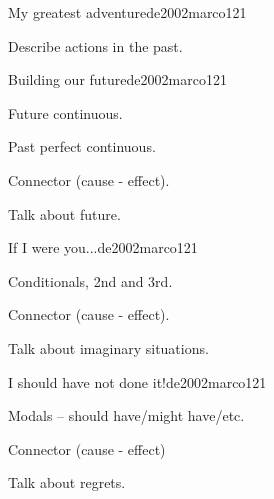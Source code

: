 \begin{syllabus}
\begin{unit}{My greatest adventure}{}{de2002marco}{12}{1}
   \begin{learningoutcomes}
      \item Describe actions in the past.
   \end{learningoutcomes}
\end{unit}

\begin{unit}{Building our future}{}{de2002marco}{12}{1}
   \begin{topics}
      \item Future continuous.
      \item Past perfect continuous.
      \item Connector (cause - effect).
   \end{topics}

   \begin{learningoutcomes}
      \item Talk about future.
   \end{learningoutcomes}

\end{unit}

\begin{unit}{If I were you...}{}{de2002marco}{12}{1}
   \begin{topics}
      \item Conditionals, 2nd and 3rd.
      \item Connector (cause - effect).
   \end{topics}

   \begin{learningoutcomes}
      \item Talk about imaginary situations. 
   \end{learningoutcomes}

\end{unit}

\begin{unit}{I should have not done it!}{}{de2002marco}{12}{1}
   \begin{topics}
      \item Modals – should have/might have/etc.
      \item Connector (cause - effect)
   \end{topics}

   \begin{learningoutcomes}
      \item Talk about regrets.
   \end{learningoutcomes}

\end{unit}


\end{syllabus}
